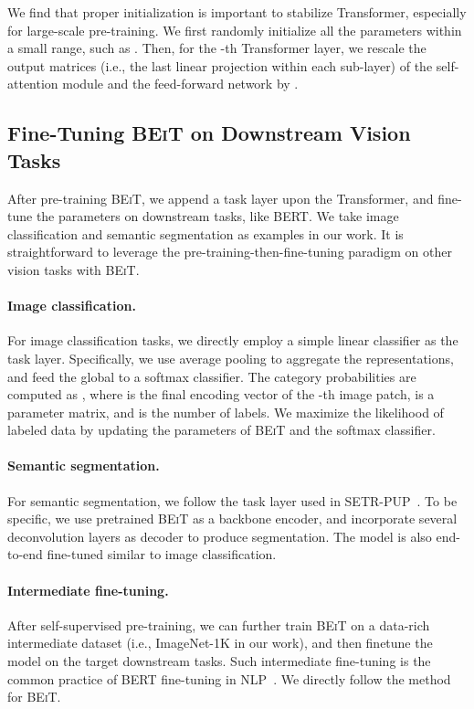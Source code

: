 \documentclass{article}
\newcommand\our{\textsc{BEiT}}
\begin{document}
We find that proper initialization is important to stabilize Transformer, especially for large-scale pre-training.
We first randomly initialize all the parameters within a small range, such as .
Then, for the -th Transformer layer, we rescale the output matrices (i.e., the last linear projection within each sub-layer) of the self-attention module and the feed-forward network by .


\subsection{Fine-Tuning \our{} on Downstream Vision Tasks}
\label{sec:ft}

After pre-training \our{}, we append a task layer upon the Transformer, and fine-tune the parameters on downstream tasks, like BERT.
We take image classification and semantic segmentation as examples in our work.
It is straightforward to leverage the pre-training-then-fine-tuning paradigm on other vision tasks with \our{}.

\paragraph{Image classification.}
For image classification tasks, we directly employ a simple linear classifier as the task layer.
Specifically, we use average pooling to aggregate the representations, and feed the global to a softmax classifier.
The category probabilities are computed as , where  is the final encoding vector of the -th image patch,  is a parameter matrix, and  is the number of labels.
We maximize the likelihood of labeled data by updating the parameters of \our{} and the softmax classifier.

\paragraph{Semantic segmentation.}
For semantic segmentation, we follow the task layer used in SETR-PUP~\citep{setr}.
To be specific, we use pretrained \our{} as a backbone encoder, and incorporate several deconvolution layers as decoder to produce segmentation.
The model is also end-to-end fine-tuned similar to image classification.

\paragraph{Intermediate fine-tuning.}
After self-supervised pre-training, we can further train \our{} on a data-rich intermediate dataset (i.e., ImageNet-1K in our work), and then finetune the model on the target downstream tasks.
Such intermediate fine-tuning is the common practice of BERT fine-tuning in NLP~\citep{intermediate:ft}. We directly follow the method for \our{}.
\end{document}
